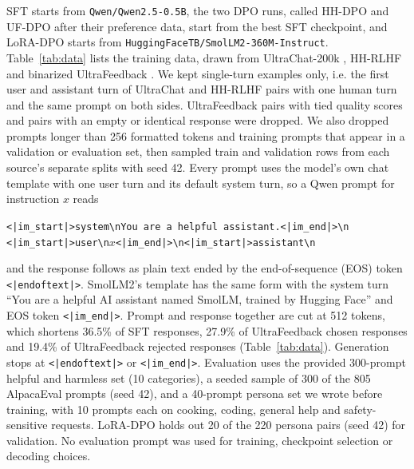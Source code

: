 \documentclass{article}
\begin{document}
SFT starts from \texttt{Qwen/Qwen2.5-0.5B}, the two DPO runs, called HH-DPO and UF-DPO after their preference data, start from the best SFT checkpoint, and LoRA-DPO starts from \texttt{HuggingFaceTB/SmolLM2-360M-Instruct}. Table~\ref{tab:data} lists the training data, drawn from UltraChat-200k \citep{ding2023enhancing}, HH-RLHF \citep{bai2022training} and binarized UltraFeedback \citep{cui2023ultrafeedback}. We kept single-turn examples only, i.e. the first user and assistant turn of UltraChat and HH-RLHF pairs with one human turn and the same prompt on both sides. UltraFeedback pairs with tied quality scores and pairs with an empty or identical response were dropped. We also dropped prompts longer than 256 formatted tokens and training prompts that appear in a validation or evaluation set, then sampled train and validation rows from each source's separate splits with seed 42. Every prompt uses the model's own chat template with one user turn and its default system turn, so a Qwen prompt for instruction $x$ reads
\begin{center}\footnotesize
\texttt{<|im\_start|>system\textbackslash nYou are a helpful assistant.<|im\_end|>\textbackslash n}\\
\texttt{<|im\_start|>user\textbackslash n}$x$\texttt{<|im\_end|>\textbackslash n<|im\_start|>assistant\textbackslash n}
\end{center}
and the response follows as plain text ended by the end-of-sequence (EOS) token \texttt{<|endoftext|>}. SmolLM2's template has the same form with the system turn ``You are a helpful AI assistant named SmolLM, trained by Hugging Face'' and EOS token \texttt{<|im\_end|>}. Prompt and response together are cut at 512 tokens, which shortens 36.5\% of SFT responses, 27.9\% of UltraFeedback chosen responses and 19.4\% of UltraFeedback rejected responses (Table~\ref{tab:data}). Generation stops at \texttt{<|endoftext|>} or \texttt{<|im\_end|>}. Evaluation uses the provided 300-prompt helpful and harmless set (10 categories), a seeded sample of 300 of the 805 AlpacaEval prompts (seed 42), and a 40-prompt persona set we wrote before training, with 10 prompts each on cooking, coding, general help and safety-sensitive requests. LoRA-DPO holds out 20 of the 220 persona pairs (seed 42) for validation. No evaluation prompt was used for training, checkpoint selection or decoding choices.

\begin{table}[t]
  \centering
  \caption{Training data after filtering. Mean tokens use the Qwen tokenizer, and Cut at 512 is the share of training responses truncated at 512 tokens (chosen / rejected for DPO). HH-RLHF includes \hhHarmless{} pairs from its harmless-base subset.}
  \label{tab:data}
  \small
  \setlength{\tabcolsep}{3pt}
  
\end{table}
\end{document}

